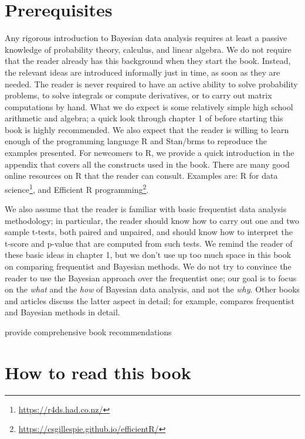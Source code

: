 \documentclass[12pt,]{krantz}
\renewcommand{\href}[2]{#2\footnote{\url{#1}}}
\let\BeginKnitrBlock\begin \let\EndKnitrBlock\end
\begin{document}
\hypertarget{prerequisites}{%
\section{Prerequisites}\label{prerequisites}}

Any rigorous introduction to Bayesian data analysis requires at least a passive knowledge of probability theory, calculus, and linear algebra. We do not require that the reader already has this background when they start the book. Instead, the relevant ideas are introduced informally just in time, as soon as they are needed. The reader is never required to have an active ability to solve probability problems, to solve integrals or compute derivatives, or to carry out matrix computations by hand. What we do expect is some relatively simple high school arithmetic and algebra; a quick look through chapter 1 of \citet{gill2006essential} before starting this book is highly recommended. We also expect that the reader is willing to learn enough of the programming language R \citep{R-base} and Stan/brms to reproduce the examples presented.
For newcomers to R, we provide a quick introduction in the appendix that covers all the constructs used in the book.
There are many good online resources on R that the reader can consult. Examples are: \href{https://r4ds.had.co.nz/}{R for data science}, and \href{https://csgillespie.github.io/efficientR/}{Efficient R programming}.

We also assume that the reader is familiar with basic frequentist data analysis methodology; in particular, the reader should know how to carry out one and two sample t-tests, both paired and unpaired, and should know how to interpret the t-score and p-value that are computed from such tests. We remind the reader of these basic ideas in chapter 1, but we don't use up too much space in this book on comparing frequentist and Bayesian methods. We do not try to convince the reader to use the Bayesian approach over the frequentist one; our goal is to focus on the \emph{what} and the \emph{how} of Bayesian data analysis, and not the \emph{why}. Other books and articles discuss the latter aspect in detail; for example, \citet{kruschke2014doing} compares frequentist and Bayesian methods in detail.

\BeginKnitrBlock{rmdnote}
provide comprehensive book recommendations
\EndKnitrBlock{rmdnote}

\hypertarget{how-to-read-this-book}{%
\section{How to read this book}\label{how-to-read-this-book}}
\end{document}
